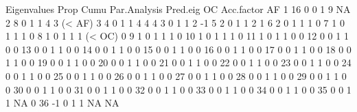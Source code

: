 \documentclass{article}
\begin{document}
   Eigenvalues Prop Cumu Par.Analysis Pred.eig     OC Acc.factor     AF
1           16    0    0            1        9                NA       
2            8    0    1            1        4                 3 (< AF)
3            4    0    1            1        4                 4       
4            3    0    1            1        2                -1       
5            2    0    1            1        2                 1       
6            2    0    1            1        1                 0       
7            1    0    1            1        1                 0       
8            1    0    1            1        1 (< OC)          0       
9            1    0    1            1        1                 0       
10           1    0    1            1        1                 0       
11           1    0    1            1        0                 0       
12           0    0    1            1        0                 0       
13           0    0    1            1        0                 0       
14           0    0    1            1        0                 0       
15           0    0    1            1        0                 0       
16           0    0    1            1        0                 0       
17           0    0    1            1        0                 0       
18           0    0    1            1        0                 0       
19           0    0    1            1        0                 0       
20           0    0    1            1        0                 0       
21           0    0    1            1        0                 0       
22           0    0    1            1        0                 0       
23           0    0    1            1        0                 0       
24           0    0    1            1        0                 0       
25           0    0    1            1        0                 0       
26           0    0    1            1        0                 0       
27           0    0    1            1        0                 0       
28           0    0    1            1        0                 0       
29           0    0    1            1        0                 0       
30           0    0    1            1        0                 0       
31           0    0    1            1        0                 0       
32           0    0    1            1        0                 0       
33           0    0    1            1        0                 0       
34           0    0    1            1        0                 0       
35           0    0    1            1       NA                 0       
36          -1    0    1            1       NA                NA       
\end{document}

